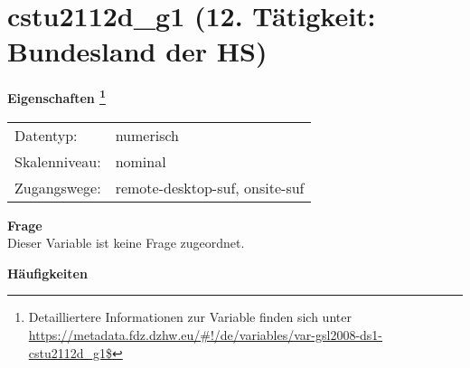 
    \setcounter{footnote}{0}

    \vspace*{-1.8cm}
	\section{cstu2112d\_g1 (12. Tätigkeit: Bundesland der HS)}
	\label{section:cstu2112d_g1}



    \vspace*{0.5cm}
    \noindent\textbf{Eigenschaften
	\footnote{Detailliertere Informationen zur Variable finden sich unter
		\url{https://metadata.fdz.dzhw.eu/\#!/de/variables/var-gsl2008-ds1-cstu2112d_g1$}}}\\
	\begin{tabularx}{\hsize}{@{}lX}
	Datentyp: & numerisch \\
	Skalenniveau: & nominal \\
	Zugangswege: &
	  remote-desktop-suf, 
	  onsite-suf
 \\
    \end{tabularx}



		\vspace*{0.5cm}
		\noindent\textbf{Frage}\\
		Dieser Variable ist keine Frage zugeordnet.





        		\vspace*{0.5cm}
                \noindent\textbf{Häufigkeiten}

